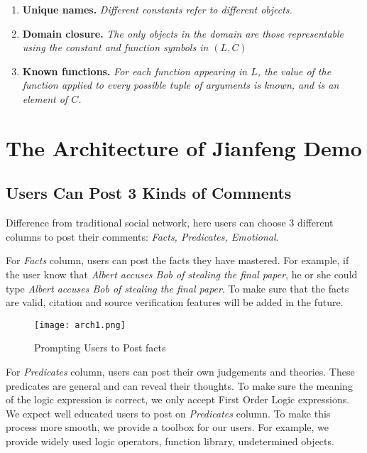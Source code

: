 \documentclass[
12pt, %
a4paper, %
oneside, %
headinclude,footinclude, %
BCOR5mm, %
]{scrartcl}
\begin{document}
\begin{enumerate}[noitemsep]
    \item \textbf{Unique names.} \textit{Different constants refer to different objects.}
    \item \textbf{Domain closure.} \textit{The only objects in the domain are those representable using the constant and function symbols in $(L,C)$}
    \item \textbf{Known functions.} \textit{For each function appearing in $L$, the value of the function applied to every possible tuple of arguments is known, and is an element of $C$.}
\end{enumerate}


\section{The Architecture of Jianfeng Demo}

\subsection{Users Can Post 3 Kinds of Comments}

Difference from traditional social network, here users can choose 3 different columns to post their comments: \textit{Facts, Predicates, Emotional}. 

For \textit{Facts} column, users can post the facts they have mastered. For example, if the user know that \textit{Albert accuses Bob of stealing the final paper}, he or she could type \textit{Albert accuses Bob of stealing the final paper}. To make sure that the facts are valid, citation and source verification features will be added in the future.

\begin{figure}[htb]
    \centering 
    \texttt{[image: arch1.png]} 
    \caption[Prompting Users to Post facts]{Prompting Users to Post facts} 
    \end{figure}

For \textit{Predicates} column, users can post their own judgements and theories. These predicates are general and can reveal their thoughts. To make sure the meaning of the logic expression is correct, we only accept First Order Logic expressions. We expect well educated users to post on \textit{Predicates} column. To make this process more smooth, we provide a toolbox for our users. For example, we provide widely used logic operators, function library, undetermined objects.
\end{document}
